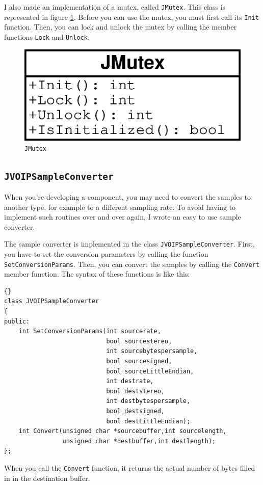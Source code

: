 		I also made an implementation of a mutex, called {\tt JMutex}. This class
		is represented in figure \ref{class-jmutex}. Before you can use the mutex,
		you must first call its {\tt Init} function. Then, you can lock and unlock
		the mutex by calling the member functions {\tt Lock} and {\tt Unlock}.
		\begin{figure}
			\center
			\includegraphics[width=0.35\linewidth]{images/manual/chapter4/class-jmutex.eps}
			\caption{\tt JMutex}
			\label{class-jmutex}
		\end{figure}
		
		\subsection{\tt JVOIPSampleConverter}
		
		When you're developing a component, you may need to convert the samples to
		another type, for example to a different sampling rate. To avoid having to
		implement such routines over and over again, I wrote an easy to use sample
		converter.
		
		The sample converter is implemented in the class {\tt JVOIPSampleConverter}.
		First, you have to set the conversion parameters by calling the function
		{\tt SetConversionParams}. Then, you can convert the samples by calling
		the {\tt Convert} member function. The syntax of these functions is like this:
		\begin{lstlisting}[frame=tb]{}
class JVOIPSampleConverter
{
public:
	int SetConversionParams(int sourcerate,
	                        bool sourcestereo,
	                        int sourcebytespersample,
	                        bool sourcesigned,
	                        bool sourceLittleEndian,
	                        int destrate,
	                        bool deststereo,
	                        int destbytespersample,
	                        bool destsigned,
	                        bool destLittleEndian);
	int Convert(unsigned char *sourcebuffer,int sourcelength,
	            unsigned char *destbuffer,int destlength);
};
	\end{lstlisting}

	When you call the {\tt Convert} function, it returns the actual number of
	bytes filled in in the destination buffer.
	
